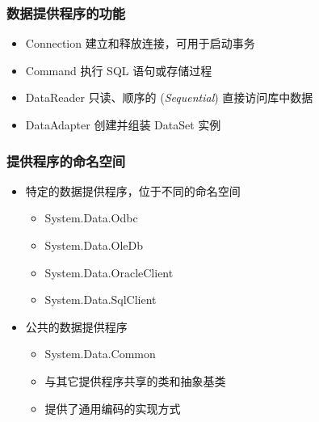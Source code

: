 \begin{frame}
\frametitle{数据提供程序的功能}
\begin{itemize}
\item Connection 建立和释放连接，可用于启动事务
\item Command 执行 SQL 语句或存储过程
\item DataReader 只读、顺序的 (\textit{Sequential}) 直接访问库中数据
\item DataAdapter 创建并组装 DataSet 实例
\end{itemize}
\begin{center}
  
\end{center}
\end{frame}

\begin{frame}
\frametitle{提供程序的命名空间}
\begin{itemize}
\setlength{\itemsep}{8pt plus 1pt}
\item 特定的数据提供程序，位于不同的命名空间
\begin{itemize}
\setlength{\itemsep}{6pt plus 1pt}
\item System.Data.Odbc
\item System.Data.OleDb
\item System.Data.OracleClient
\item System.Data.SqlClient
\end{itemize}
\item 公共的数据提供程序
  \begin{itemize}
  \item System.Data.Common
  \smallskip
  \item 与其它提供程序共享的类和抽象基类
  \item 提供了通用编码的实现方式
  \end{itemize}
\end{itemize}
\end{frame}

